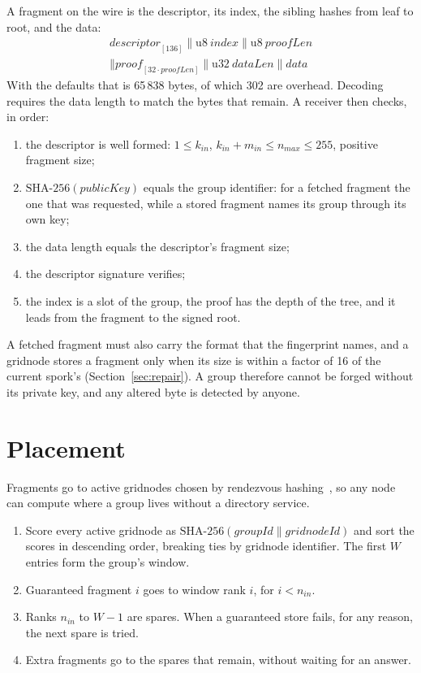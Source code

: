 \documentclass[10pt,a4paper,final]{article}
\newcommand{\cat}{\mathbin{\|}}
\begin{document}
A fragment on the wire is the descriptor, its index, the sibling hashes from leaf to root, and the data:
\begin{multline}
	\mathit{descriptor}_{[136]} \cat \mathrm{u8}\ \mathit{index} \cat \mathrm{u8}\ \mathit{proofLen} \\
	\cat \mathit{proof}_{[32 \cdot \mathit{proofLen}]} \cat \mathrm{u32}\ \mathit{dataLen} \cat \mathit{data}
\end{multline}
With the defaults that is 65\,838 bytes, of which 302 are overhead. Decoding requires the data length to match the
bytes that remain. A receiver then checks, in order:

\begin{enumerate}
	\item the descriptor is well formed: $1 \le k_{in}$, $k_{in} + m_{in} \le n_{max} \le 255$, positive fragment
	      size;
	\item $\mathrm{SHA\text{-}256}(\mathit{publicKey})$ equals the group identifier: for a fetched fragment the one
	      that was requested, while a stored fragment names its group through its own key;
	\item the data length equals the descriptor's fragment size;
	\item the descriptor signature verifies;
	\item the index is a slot of the group, the proof has the depth of the tree, and it leads from the fragment to
	      the signed root.
\end{enumerate}

A fetched fragment must also carry the format that the fingerprint names, and a gridnode stores a fragment only when
its size is within a factor of 16 of the current spork's (Section~\ref{sec:repair}). A group therefore cannot be
forged without its private key, and any altered byte is detected by anyone.

\section{Placement}
\label{sec:placement}

Fragments go to active gridnodes chosen by rendezvous hashing~\cite{thaler1998}, so any node can compute where a
group lives without a directory service.

\begin{enumerate}
	\item Score every active gridnode as $\mathrm{SHA\text{-}256}(\mathit{groupId} \cat \mathit{gridnodeId})$ and sort
	      the scores in descending order, breaking ties by gridnode identifier. The first $W$ entries form the
	      group's window.
	\item Guaranteed fragment $i$ goes to window rank $i$, for $i < n_{in}$.
	\item Ranks $n_{in}$ to $W - 1$ are spares. When a guaranteed store fails, for any reason, the next spare is
	      tried.
	\item Extra fragments go to the spares that remain, without waiting for an answer.
\end{enumerate}
\end{document}

